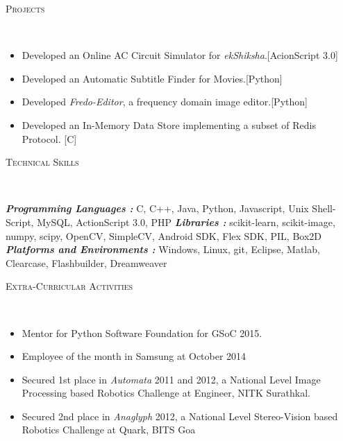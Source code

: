 \documentclass[9pt]{article}
\newenvironment{changemargin}[2]{%
  \begin{list}{}{%
    \setlength{\topsep}{0pt}%
    \setlength{\leftmargin}{#1}%
    \setlength{\rightmargin}{#2}%
    \setlength{\listparindent}{\parindent}%
    \setlength{\itemindent}{\parindent}%
    \setlength{\parsep}{\parskip}%
  }%
  \item[]}{\end{list}
}
\newcommand{\lineover}{
	\begin{changemargin}{-0.05in}{-0.05in}
		\vspace*{-8pt}
		\color{NavyBlue}
		\hrulefill \\
		\vspace*{-2pt}
	\end{changemargin}
}
\newcommand{\header}[1]{
	\begin{changemargin}{-0.5in}{-0.5in}
		\scshape{\textcolor{NavyBlue}{#1}}\\
  	\lineover
	\end{changemargin}
}
\newenvironment{body} {
	\vspace*{-16pt}
	\begin{changemargin}{-0.25in}{-0.5in}
  }	
	{\end{changemargin}
}
\begin{document}
\header{Projects}

\begin{body}
	\vspace{14pt}
	\begin{itemize} \itemsep -0pt
		\item Developed an Online AC Circuit Simulator for \emph{ekShiksha}.\hfill [AcionScript 3.0]
		\item Developed an Automatic Subtitle Finder for Movies.\hfill [Python]
		\item Developed \emph{Fredo-Editor}, a frequency domain image editor.\hfill [Python]
		\item Developed an In-Memory Data Store implementing a subset of Redis Protocol. \hfill [C]

	\end{itemize}
\end{body}

\smallskip


\header{ Technical Skills}

\begin{body}
	\vspace{14pt}
	\emph{\textbf{Programming Languages :}}\newline
	{C, C++, Java, Python, Javascript, Unix Shell-Script, MySQL, ActionScript 3.0, PHP}
	\medskip \newline
	\emph{\textbf{Libraries :}}\newline
	{scikit-learn, scikit-image, numpy, scipy, OpenCV, SimpleCV, Android SDK, Flex SDK, PIL, Box2D}
	\medskip \newline
	\emph{\textbf{Platforms and Environments :}}\newline
	{Windows, Linux, git, Eclipse, Matlab, Clearcase, Flashbuilder, Dreamweaver }
\end{body}

\smallskip


\header{Extra-Curricular Activities}

\begin{body}
	\vspace{14pt}
	\begin{itemize}
		\item Mentor for Python Software Foundation for GSoC 2015.
		\item Employee of the month in Samsung at October 2014
		\item Secured 1st place in \emph{Automata} 2011 and 2012, a National Level Image Processing based Robotics Challenge at Engineer, NITK Surathkal.
		\item Secured 2nd place in \emph{Anaglyph} 2012, a National Level Stereo-Vision based Robotics Challenge at Quark, BITS Goa

	\end{itemize}
\end{body}

\smallskip


\end{document}
